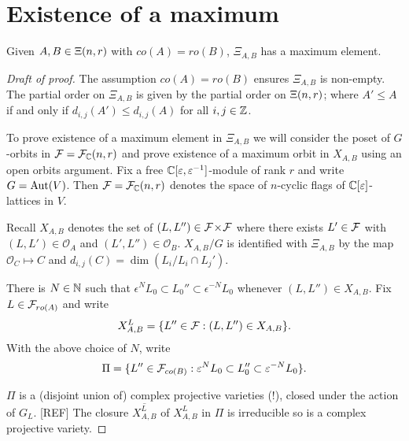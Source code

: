 \documentclass[a4paper, 11pt]{report}
\begin{document}
\section{Existence of a maximum}

\begin{proposition}\label{proposition:existence-maximum}
Given $A,B\in\Xi(n,r)$ with $co(A)=ro(B)$, $\Xi_{A,B}$ has a maximum element.
\end{proposition}

\begin{proof}[Draft of proof]
The assumption $co(A)=ro(B)$ ensures $\Xi_{A,B}$ is non-empty. The partial order on $\Xi_{A,B}$ is given by the partial order on $\Xi(n,r)$; where $A'\le A$ if and only if $d_{i,j}(A')\le d_{i,j}(A)$ for all $i,j\in\mathbb{Z}$.

To prove existence of a maximum element in $\Xi_{A,B}$ we will consider the poset of $G$-orbits in $\mathcal{F}=\mathcal{F}_{\mathbb{C}}(n,r)$ and prove existence of a maximum orbit in $X_{A,B}$ using an open orbits argument. Fix a free $\mathbb{C}[\varepsilon,\varepsilon^{-1}]$-module of rank $r$ and write $G=\operatorname{Aut}(V)$. Then $\mathcal{F} = \mathcal{F}_{\mathbb{C}}(n,r)$ denotes the space of $n$-cyclic flags of $\mathbb{C}[\varepsilon]$-lattices in $V$.

Recall $X_{A,B}$ denotes the set of $(L,L'')\in{\mathcal{F}\!\times\!\mathcal{F}}$ where there exists $L'\in\mathcal{F}$ with $(L,L')\in\mathcal{O}_A$ and $(L',L'')\in\mathcal{O}_B$. $X_{A,B}/G$ is identified with $\Xi_{A,B}$ by the map $\mathcal{O}_C\mapsto C$ and $d_{i,j}(C) = \dim(L_i/{L_i\cap L_j'})$.

There is $N\in\mathbb{N}$ such that $\epsilon^N L_0\subset L_0''\subset \epsilon^{-N}L_0$ whenever $(L,L'')\in X_{A,B}$. Fix $L\in\mathcal{F}_{ro(A)}$ and write
\begin{equation*}
X_{A,B}^L = \{L''\in\mathcal{F}: (L,L'')\in X_{A,B}\}.
\end{equation*}
With the above choice of $N$, write
\begin{equation*}
\Pi = \{L''\in\mathcal{F}_{co(B)}: \varepsilon^N L_0\subset L_0''\subset \varepsilon^{-N} L_0\}.
\end{equation*}

$\Pi$ is a (disjoint union of) complex projective varieties (!), closed under the action of $G_L$. [REF] The closure $\overline{X_{A,B}^L}$ of $X_{A,B}^L$ in $\Pi$ is irreducible so is a complex projective variety.


\end{proof}
\end{document}
